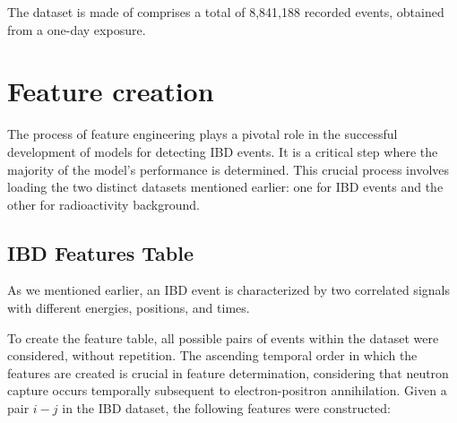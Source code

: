 The dataset is made of comprises a total of 8,841,188 recorded events, obtained from a one-day exposure.

\newpage

\section{Feature creation}
The process of feature engineering plays a pivotal role in the successful development of models for detecting IBD events. It is a critical step where the majority of the model's performance is determined. This crucial process involves loading the two distinct datasets mentioned earlier: one for IBD events and the other for radioactivity background.


\subsection{IBD Features Table}
As we mentioned earlier, an IBD event is characterized by two correlated signals with different energies, positions, and times. 

To create the feature table, all possible pairs of events within the dataset were considered, without repetition. The ascending temporal order in which the features are created is crucial in feature determination, considering that neutron capture occurs temporally subsequent to electron-positron annihilation. 
Given a pair $i-j$ in the IBD dataset, the following features were constructed:


